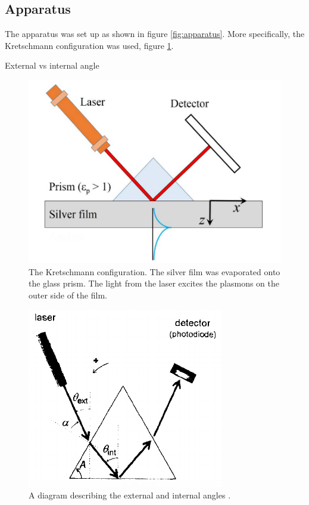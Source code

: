 \documentclass[%
reprint,
amsmath,amssymb,
aps,
]{revtex4-2}
\begin{document}
		\subsection{Apparatus}
			The apparatus was set up as shown in figure \ref{fig:apparatus}. More specifically, the Kretschmann configuration was used, figure \ref{fig:kConfig}.
			
			
			External vs internal angle
			\begin{figure}
				\includegraphics[width=0.9\columnwidth]{kConfig.png}
				\caption{\label{fig:kConfig} The Kretschmann configuration. The silver film was evaporated onto the glass prism. The light from the laser excites the plasmons on the outer side of the film. \cite{opticalApplications}}
			\end{figure}
		
			\begin{figure}
				\includegraphics[width=0.9\columnwidth]{anglesDiagram.png}
				\caption{\label{fig:angles} A diagram describing the external and internal angles \cite{pluchery}.}
			\end{figure}
	 
\end{document}

